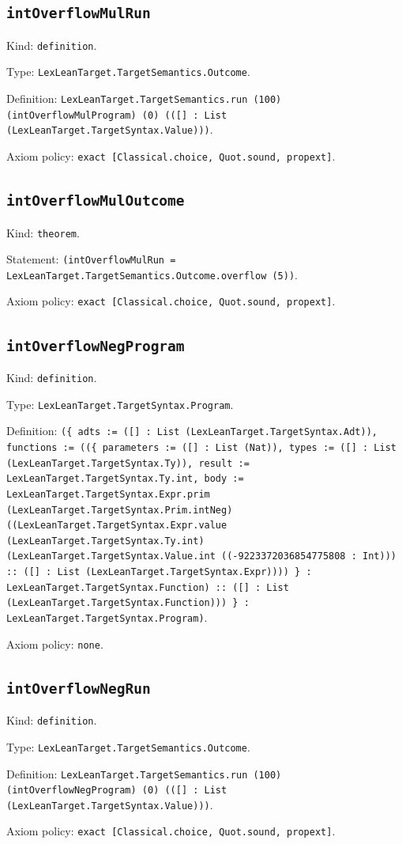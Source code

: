 \documentclass[11pt]{article}
\begin{document}
\subsection*{\texttt{intOverflowMulRun}}
\noindent Kind: \texttt{definition}.\par
\noindent Type: \texttt{LexLeanTarget.TargetSemantics.Outcome}.\par
\noindent Definition: \texttt{LexLeanTarget.TargetSemantics.run (100) (intOverflowMulProgram) (0) (([] : List (LexLeanTarget.TargetSyntax.Value)))}.\par
\noindent Axiom policy: \texttt{exact [Classical.choice, Quot.sound, propext]}.\par
\subsection*{\texttt{intOverflowMulOutcome}}
\noindent Kind: \texttt{theorem}.\par
\noindent Statement: \texttt{(intOverflowMulRun = LexLeanTarget.TargetSemantics.Outcome.overflow (5))}.\par
\noindent Axiom policy: \texttt{exact [Classical.choice, Quot.sound, propext]}.\par
\subsection*{\texttt{intOverflowNegProgram}}
\noindent Kind: \texttt{definition}.\par
\noindent Type: \texttt{LexLeanTarget.TargetSyntax.Program}.\par
\noindent Definition: \texttt{(\{ adts := ([] : List (LexLeanTarget.TargetSyntax.Adt)), functions := ((\{ parameters := ([] : List (Nat)), types := ([] : List (LexLeanTarget.TargetSyntax.Ty)), result := LexLeanTarget.TargetSyntax.Ty.int, body := LexLeanTarget.TargetSyntax.Expr.prim (LexLeanTarget.TargetSyntax.Prim.intNeg) ((LexLeanTarget.TargetSyntax.Expr.value (LexLeanTarget.TargetSyntax.Ty.int) (LexLeanTarget.TargetSyntax.Value.int ((-9223372036854775808 : Int))) :: ([] : List (LexLeanTarget.TargetSyntax.Expr)))) \} : LexLeanTarget.TargetSyntax.Function) :: ([] : List (LexLeanTarget.TargetSyntax.Function))) \} : LexLeanTarget.TargetSyntax.Program)}.\par
\noindent Axiom policy: \texttt{none}.\par
\subsection*{\texttt{intOverflowNegRun}}
\noindent Kind: \texttt{definition}.\par
\noindent Type: \texttt{LexLeanTarget.TargetSemantics.Outcome}.\par
\noindent Definition: \texttt{LexLeanTarget.TargetSemantics.run (100) (intOverflowNegProgram) (0) (([] : List (LexLeanTarget.TargetSyntax.Value)))}.\par
\noindent Axiom policy: \texttt{exact [Classical.choice, Quot.sound, propext]}.\par
\end{document}
